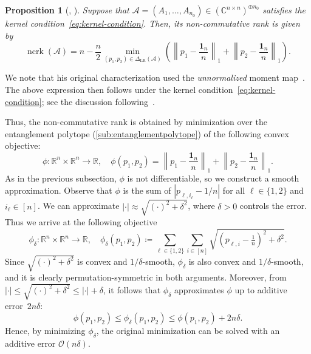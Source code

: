 \documentclass[11pt,letterpaper]{article}
\newtheorem{proposition}[theorem]{Proposition}\AddToHook{env/proposition/begin}{\crefalias{theorem}{proposition}}\crefname{proposition}{Proposition}{Propositions}
\numberwithin{equation}{section}
\newcommand{\op}{\oplus}
\newcommand{\RR}{\mathbb{R}}
\newcommand{\CC}{\mathbb{C}}
\DeclareMathOperator{\ncrk}{ncrk}
\begin{document}
\begin{proposition}[{\cite[Thm.~1.4]{Hirai-ncrank}, \cite[Thm.~4.10]{Hirai2025}}]\label{prop:hirai}
    Suppose that $\mathcal{A} = (A_1, \ldots, A_{n_0}) \in (\CC^{n\times n})^{\op n_0}$ satisfies the kernel condition~\eqref{eq:kernel-condition}.
    Then, its non-commutative rank is given by
    \[
        \ncrk(\mathcal{A}) = n - \frac{n}2\min_{(p_1, p_2) \in \Delta_{\mathrm{LR}}(\mathcal{A})}\left(\left\|p_1 - \frac{\bm{1}_n}n\right\|_1 + \left\|p_2 - \frac{\bm{1}_n}n\right\|_1\right).
    \]
\end{proposition}

\noindent
We note that his original characterization used the \emph{unnormalized} moment map~\cite[Thm.~1.4]{Hirai-ncrank}.
The above expression then follows under the kernel condition~\eqref{eq:kernel-condition}; see the discussion following~\cite[Thm.~4.10]{Hirai2025}.

Thus, the non-commutative rank is obtained by minimization over the entanglement polytope (\cref{sub:entanglementpolytope}) of the following convex objective:
\[
    \phi \colon \RR^n \times \RR^n \to \RR, \quad \phi(p_1, p_2) = \left\|p_1 - \frac{\bm{1}_n}n\right\|_1 + \left\|p_2 - \frac{\bm{1}_n}n\right\|_1.
\]
As in the previous subsection, $\phi$ is not differentiable, so we construct a smooth approximation.
Observe that $\phi$ is the sum of $|p_{\ell, i_\ell} - 1/n|$ for all $\ell \in \{1,2\}$ and~$i_\ell \in [n]$.
We can approximate $|\cdot| \approx \sqrt{(\cdot)^2 + \delta^2}$, where $\delta > 0$ controls the error.
Thus we arrive at the following objective
\[
    \phi_\delta \colon \RR^n \times \RR^n \to \RR, \quad\phi_\delta(p_1, p_2) \coloneqq \sum_{\ell \in \{1, 2\}}\sum_{i \in [n]}\sqrt{\left(p_{\ell, i} - \tfrac1n\right)^2 + \delta^2}.
\]
Since $\sqrt{(\cdot)^2 + \delta^2}$ is convex and $1/\delta$-smooth, $\phi_\delta$ is also convex and $1/\delta$-smooth, and it is clearly permutation-symmetric in both arguments.
Moreover, from $|\cdot| \le \sqrt{(\cdot)^2 + \delta^2} \le |\cdot| + \delta$, it follows that $\phi_\delta$ approximates $\phi$ up to additive error~$2n\delta$:
\begin{equation}\label{eq:ncrank error}
    \phi(p_1, p_2) \le \phi_\delta(p_1, p_2) \le \phi(p_1, p_2) + 2n\delta.
\end{equation}
Hence, by minimizing $\phi_\delta$, the original minimization can be solved with an additive error $\mathcal{O}(n\delta)$.
\end{document}
